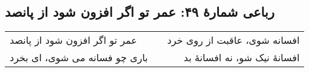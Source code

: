 \begin{center}
\section*{رباعی شمارهٔ ۴۹:  عمر تو اگر افزون شود از پانصد}
\label{sec:049}
\begin{longtable}{l p{0.5cm} r}
 عمر تو اگر افزون شود از پانصد
&&
افسانه شوی، عاقبت از روی خرد
\\
باری چو فسانه می شوی، ای بخرد
&&
افسانهٔ نیک شو، نه افسانهٔ بد
\\
\end{longtable}
\end{center}
